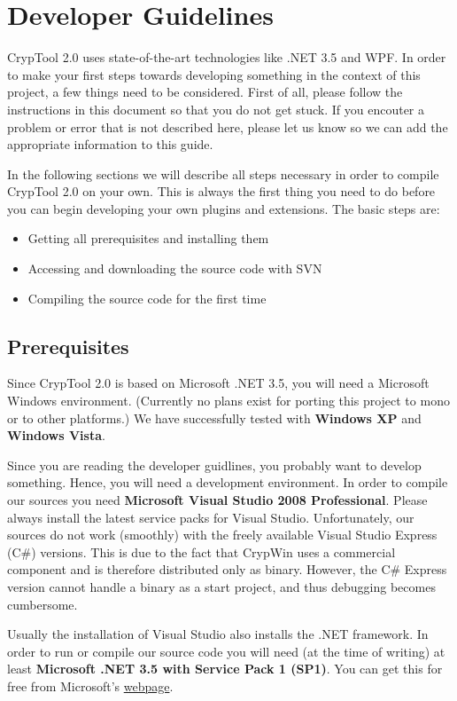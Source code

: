 \chapter{Developer Guidelines}

CrypTool 2.0 uses state-of-the-art technologies like .NET 3.5 and WPF. In order to make your first steps towards developing something in the context of this project, a few things need to be considered. First of all, please follow the instructions in this document so that you do not get stuck. If you encouter a problem or error that is not described here, please let us know so we can add the appropriate information to this guide.

In the following sections we will describe all steps necessary in order to compile CrypTool 2.0 on your own. This is always the first thing you need to do before you can begin developing your own plugins and extensions. The basic steps are:
\begin{itemize}
	\item Getting all prerequisites and installing them
	\item Accessing and downloading the source code with SVN
	\item Compiling the source code for the first time
\end{itemize}

\section{Prerequisites}

Since CrypTool 2.0 is based on Microsoft .NET 3.5, you will need a Microsoft Windows environment. (Currently no plans exist for porting this project to mono or to other platforms.) We have successfully tested with \textbf{Windows XP} and \textbf{Windows Vista}.

Since you are reading the developer guidlines, you probably want to develop something. Hence, you will need a development environment. In order to compile our sources you need \textbf{Microsoft Visual Studio 2008 Professional}. Please always install the latest service packs for Visual Studio. Unfortunately, our sources do not work (smoothly) with the freely available Visual Studio Express (C\#) versions. This is due to the fact that CrypWin uses a commercial component and is therefore distributed only as binary. However, the C\# Express version cannot handle a binary as a start project, and thus debugging becomes cumbersome.

Usually the installation of Visual Studio also installs the .NET framework. In order to run or compile our source code you will need (at the time of writing) at least \textbf{Microsoft .NET 3.5 with Service Pack 1 (SP1)}. You can get this for free from Microsoft's \href{http://download.microsoft.com/download/2/0/e/20e90413-712f-438c-988e-fdaa79a8ac3d/dotnetfx35.exe}{webpage}.


